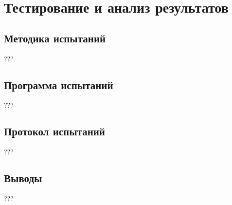 \chapter{Тестирование и анализ результатов}

\section{Методика испытаний}

???

\section{Программа испытаний}

???

\section{Протокол испытаний}

???

\section{Выводы}

???
